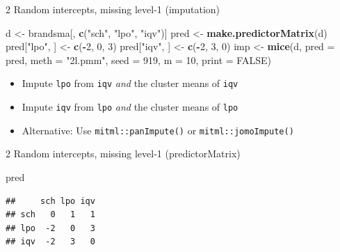 \documentclass[ignorenonframetext,aspectratio=43]{beamer}
\newenvironment{Shaded}{\begin{snugshade}}{\end{snugshade}}
\newcommand{\KeywordTok}[1]{\textcolor[rgb]{0.13,0.29,0.53}{\textbf{#1}}}
\newcommand{\DataTypeTok}[1]{\textcolor[rgb]{0.13,0.29,0.53}{#1}}
\newcommand{\DecValTok}[1]{\textcolor[rgb]{0.00,0.00,0.81}{#1}}
\newcommand{\StringTok}[1]{\textcolor[rgb]{0.31,0.60,0.02}{#1}}
\newcommand{\OtherTok}[1]{\textcolor[rgb]{0.56,0.35,0.01}{#1}}
\newcommand{\OperatorTok}[1]{\textcolor[rgb]{0.81,0.36,0.00}{\textbf{#1}}}
\newcommand{\NormalTok}[1]{#1}
\providecommand{\tightlist}{%
  \setlength{\itemsep}{0pt}\setlength{\parskip}{0pt}}
\begin{document}
\begin{frame}[fragile]{2 Random intercepts, missing level-1
(imputation)}

\begin{Shaded}
\begin{Highlighting}[]
\NormalTok{d <-}\StringTok{ }\NormalTok{brandsma[, }\KeywordTok{c}\NormalTok{(}\StringTok{"sch"}\NormalTok{, }\StringTok{"lpo"}\NormalTok{, }\StringTok{"iqv"}\NormalTok{)]}
\NormalTok{pred <-}\StringTok{ }\KeywordTok{make.predictorMatrix}\NormalTok{(d)}
\NormalTok{pred[}\StringTok{"lpo"}\NormalTok{, ] <-}\StringTok{ }\KeywordTok{c}\NormalTok{(}\OperatorTok{-}\DecValTok{2}\NormalTok{, }\DecValTok{0}\NormalTok{, }\DecValTok{3}\NormalTok{)}
\NormalTok{pred[}\StringTok{"iqv"}\NormalTok{, ] <-}\StringTok{ }\KeywordTok{c}\NormalTok{(}\OperatorTok{-}\DecValTok{2}\NormalTok{, }\DecValTok{3}\NormalTok{, }\DecValTok{0}\NormalTok{)}
\NormalTok{imp <-}\StringTok{ }\KeywordTok{mice}\NormalTok{(d, }\DataTypeTok{pred =}\NormalTok{ pred, }\DataTypeTok{meth =} \StringTok{"2l.pmm"}\NormalTok{, }\DataTypeTok{seed =} \DecValTok{919}\NormalTok{,}
            \DataTypeTok{m =} \DecValTok{10}\NormalTok{, }\DataTypeTok{print =} \OtherTok{FALSE}\NormalTok{)}
\end{Highlighting}
\end{Shaded}

\begin{itemize}
\tightlist
\item
  Impute \texttt{lpo} from \texttt{iqv} \emph{and} the cluster means of
  \texttt{iqv}
\item
  Impute \texttt{iqv} from \texttt{lpo} \emph{and} the cluster means of
  \texttt{lpo}
\item
  Alternative: Use \texttt{mitml::panImpute()} or
  \texttt{mitml::jomoImpute()}
\end{itemize}

\end{frame}

\begin{frame}[fragile]{2 Random intercepts, missing level-1
(predictorMatrix)}

\begin{Shaded}
\begin{Highlighting}[]
\NormalTok{pred}
\end{Highlighting}
\end{Shaded}

\begin{verbatim}
##     sch lpo iqv
## sch   0   1   1
## lpo  -2   0   3
## iqv  -2   3   0
\end{verbatim}

\end{frame}
\end{document}
